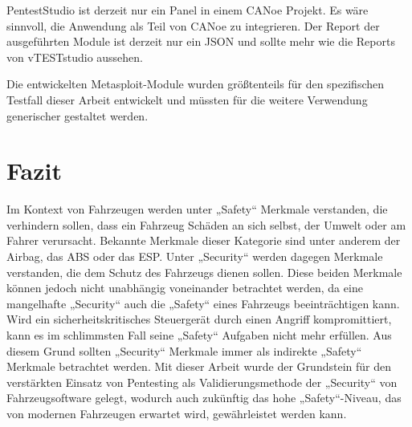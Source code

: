 PentestStudio ist derzeit nur ein Panel in einem CANoe Projekt. Es wäre sinnvoll, die Anwendung als Teil von CANoe zu integrieren. Der Report der ausgeführten Module ist derzeit nur ein JSON und sollte mehr wie die Reports von vTESTstudio aussehen. 

Die entwickelten Metasploit-Module wurden größtenteils für den spezifischen Testfall dieser Arbeit entwickelt und müssten für die weitere Verwendung generischer gestaltet werden.

\section{Fazit}\label{sec:fazit}

Im Kontext von Fahrzeugen werden unter „Safety“ Merkmale verstanden, die verhindern sollen, dass ein Fahrzeug Schäden an sich selbst, der Umwelt oder am Fahrer verursacht. Bekannte Merkmale dieser Kategorie sind unter anderem der Airbag, das ABS oder das ESP. Unter „Security“ werden dagegen Merkmale verstanden, die dem Schutz des Fahrzeugs dienen sollen. Diese beiden Merkmale können jedoch nicht unabhängig voneinander betrachtet werden, da eine mangelhafte „Security“ auch die „Safety“ eines Fahrzeugs beeinträchtigen kann. Wird ein sicherheitskritisches Steuergerät durch einen Angriff kompromittiert, kann es im schlimmsten Fall seine „Safety“ Aufgaben nicht mehr erfüllen. Aus diesem Grund sollten „Security“ Merkmale immer als indirekte „Safety“ Merkmale betrachtet werden. Mit dieser Arbeit wurde der Grundstein für den verstärkten Einsatz von Pentesting als Validierungsmethode der „Security“ von Fahrzeugsoftware gelegt, wodurch auch zukünftig das hohe „Safety“-Niveau, das von modernen Fahrzeugen erwartet wird, gewährleistet werden kann.